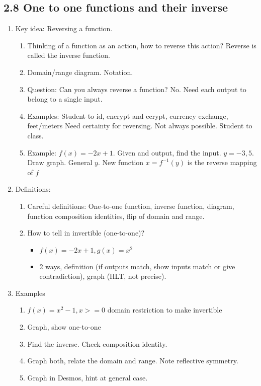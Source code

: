 \documentclass{article}
\begin{document}
\subsection{2.8 One to one functions and their inverse}

\begin{enumerate}

\item Key idea: Reversing a function.
\begin{enumerate}
\item Thinking of a function as an action, how to reverse this action? Reverse is called the inverse function.
\item Domain/range diagram. Notation.
\item Question: Can you always reverse a function? No. Need each output to belong to a single input.
\item Examples: Student to id, encrypt and ecrypt, currency exchange, feet/meters
Need certainty for reversing. Not always possible. Student to class.
\item Example: $f(x) = -2x+1$. Given and output, find the input. $y=-3,5$. Draw graph. General $y$. New function $x=f^{-1}(y)$ is the reverse mapping of $f$
\end{enumerate}

\item Definitions:
\begin{enumerate}
\item Careful definitions: One-to-one function, inverse function, diagram, function composition identities, flip of domain and range.
\item How to tell in invertible (one-to-one)? 
\begin{itemize}
\item $f(x) = -2x+1, g(x)=x^2$
\item 2 ways, definition (if outputs match, show inputs match or give contradiction), graph (HLT, not precise). 
\end{itemize}
\end{enumerate}

\item Examples
\begin{enumerate}
\item $f(x) = x^2-1, x>=0$ domain restriction to make invertible
\item Graph, show one-to-one
\item Find the inverse. Check composition identity.
\item Graph both, relate the domain and range. Note reflective symmetry.
\item Graph in Desmos, hint at general case.
\end{enumerate}


\end{enumerate}
\end{document}
